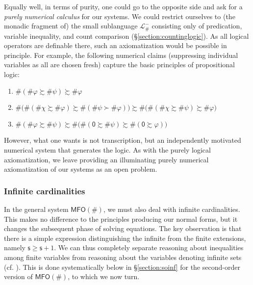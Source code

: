 \documentclass[12pt,oneside,reqno]{amsart}
\theoremstyle{definition}
\begin{document}

Equally well, in terms of purity, one could go to the opposite side and ask for a \emph{purely numerical calculus} for our systems. We could restrict ourselves to (the monadic fragment of) the small sublanguage $\mathcal{L}_\#^-$ consisting only of predication, variable inequality, and count comparison (\S\ref{section:countinglogic}). As all logical operators are definable there, such an axiomatization would be possible in principle. For example, the following numerical claims (suppressing individual variables as all are chosen fresh) capture the basic principles of propositional logic:
\vspace{0.5ex}
    \begin{enumerate}
        \item $\#(\#\varphi \succsim \#\psi) \succsim \#\varphi$
        \vspace{1ex}
        \item $\#\big( \#(\#\chi \succsim \#\varphi) \succsim \#(\#\psi \succ \#\varphi) \big) \succsim \#\big( \#(\#\chi \succsim \#\psi) \succsim \#\varphi \big)$
        \vspace{1ex}
        \item $\#(\#\varphi \succsim \#\psi) \succsim \#\big( \#(\mathsf{0} \succsim \#\psi) \succsim \#(\mathsf{0} \succsim \varphi) \big)$
    \end{enumerate}\vspace{0.5ex}
However, what one wants is not transcription, but an independently motivated numerical system that generates the logic. As with the purely logical axiomatization, we leave  providing an illuminating purely numerical  axiomatization of our systems as an open problem.


\subsubsection*{Infinite cardinalities} In the general system $\mathsf{MFO}(\#)$, we must also deal with infinite cardinalities. This makes no difference to the principles producing our normal forms, but it changes the subsequent phase of solving equations. The key observation is that there is a simple expression distinguishing the infinite from the finite extensions, namely $\mathsf{s} \geq \mathsf{s} + 1$. We can thus completely separate reasoning about inequalities among finite variables from reasoning about the variables denoting infinite sets (cf. \citealt{Ding2020}). This is done systematically below in \S\ref{section:soinf} for the second-order version of $\mathsf{MFO}(\#)$, to which we now turn. 
\end{document}

